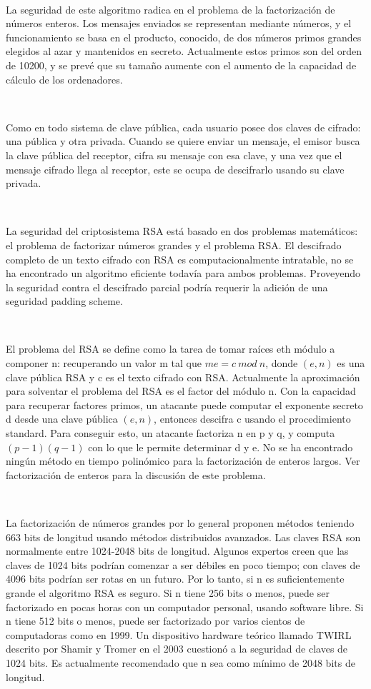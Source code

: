 \documentclass[11pt, conference]{IEEEtran}
\begin{document}
\

La seguridad de este algoritmo radica en el problema de la factorización de números enteros. Los mensajes enviados se representan mediante números, y el funcionamiento se basa en el producto, conocido, de dos números primos grandes elegidos al azar y mantenidos en secreto. Actualmente estos primos son del orden de 10200, y se prevé que su tamaño aumente con el aumento de la capacidad de cálculo de los ordenadores.

\

Como en todo sistema de clave pública, cada usuario posee dos claves de cifrado: una pública y otra privada. Cuando se quiere enviar un mensaje, el emisor busca la clave pública del receptor, cifra su mensaje con esa clave, y una vez que el mensaje cifrado llega al receptor, este se ocupa de descifrarlo usando su clave privada.

\

La seguridad del criptosistema RSA está basado en dos problemas matemáticos: el problema de factorizar números grandes y el problema RSA. El descifrado completo de un texto cifrado con RSA es computacionalmente intratable, no se ha encontrado un algoritmo eficiente todavía para ambos problemas. Proveyendo la seguridad contra el descifrado parcial podría requerir la adición de una seguridad padding scheme.

\

El problema del RSA se define como la tarea de tomar raíces eth módulo a componer n: recuperando un valor m tal que $me=c\ mod\ n$, donde $(e, n)$ es una clave pública RSA y c es el texto cifrado con RSA. Actualmente la aproximación para solventar el problema del RSA es el factor del módulo n. Con la capacidad para recuperar factores primos, un atacante puede computar el exponente secreto d desde una clave pública $(e, n)$, entonces descifra c usando el procedimiento standard. Para conseguir esto, un atacante factoriza n en p y q, y computa $(p-1)(q-1)$ con lo que le permite determinar d y e. No se ha encontrado ningún método en tiempo polinómico para la factorización de enteros largos. Ver factorización de enteros para la discusión de este problema.

\

La factorización de números grandes por lo general proponen métodos teniendo 663 bits de longitud usando métodos distribuidos avanzados. Las claves RSA son normalmente entre 1024-2048 bits de longitud. Algunos expertos creen que las claves de 1024 bits podrían comenzar a ser débiles en poco tiempo; con claves de 4096 bits podrían ser rotas en un futuro. Por lo tanto, si n es suficientemente grande el algoritmo RSA es seguro. Si n tiene 256 bits o menos, puede ser factorizado en pocas horas con un computador personal, usando software libre. Si n tiene 512 bits o menos, puede ser factorizado por varios cientos de computadoras como en 1999. Un dispositivo hardware teórico llamado TWIRL descrito por Shamir y Tromer en el 2003 cuestionó a la seguridad de claves de 1024 bits. Es actualmente recomendado que n sea como mínimo de 2048 bits de longitud.
\end{document}
